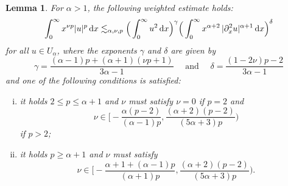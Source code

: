 \documentclass[reqno,12pt]{amsart}
\renewcommand{\d}{\ensuremath{\mathrm{d}}}
\renewcommand{\d}{\ensuremath{{\rm d}}}
\newtheorem{lemma}[theorem]{Lemma}
\numberwithin{equation}{section}
\begin{document}
%
\begin{lemma}\label{lem:xu-int}
For $\alpha >1$, the following weighted estimate holds:
\begin{equation}\label{eq:weight xu lp}
\int_0^\infty x^{\nu p} | u|^p \, \d x \lesssim_{\alpha,\nu,p} \Big(\int_0^\infty u^2 \, \d x\Big)^{\gamma} \Big(\int_0^\infty x^{\alpha+2} \, |\partial_x^2 u|^{\alpha+1} \, \d x\Big)^{\delta}
\end{equation}
% 
for all $u \in U_\alpha$, where the exponents $\gamma$ and $\delta$ are given by 
\begin{equation*}
\gamma = \frac{(\alpha -1)p + (\alpha +1)(\nu p +1)}{3\alpha -1} \quad \text{ and } \quad \delta= \frac{(1-2\nu)p-2}{3\alpha -1}
\end{equation*}
%
and one of the following conditions is satisfied:
%
\begin{enumerate}[(i)]
\item\label{it:lp-cond1} it holds $2 \leq p \leq \alpha +1$ and $\nu$ must satisfy $\nu = 0$ if $p = 2$ and
\begin{equation*}
\nu \in \Big[- \frac{\alpha(p-2)}{(\alpha -1)p}, \frac{(\alpha +2)(p-2)}{(5\alpha +3)p}\Big)
\end{equation*}
if $p > 2$;
\item\label{it:lp-cond2} it holds $p \geq \alpha +1$ and $\nu$  must satisfy 
\begin{equation*}
 \nu \in \Big[- \frac{\alpha +1 + (\alpha-1)p}{(\alpha +1)p}, \frac{(\alpha +2)(p-2)}{(5\alpha +3)p}\Big).
\end{equation*}
\end{enumerate}
%
\end{lemma}
%
\end{document}
